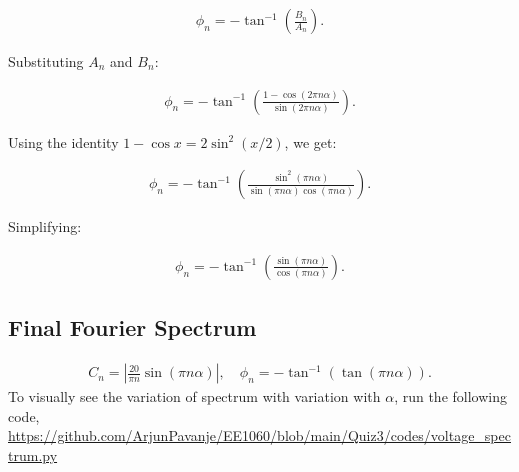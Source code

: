 \documentclass[12pt,a4paper]{report}
\begin{document}
\begin{align}
\phi_n = -\tan^{-1} \left( \frac{B_n}{A_n} \right).
\end{align}

Substituting $ A_n $ and $ B_n $:

\begin{align}
\phi_n = -\tan^{-1} \left( \frac{1 - \cos(2\pi n \alpha)}{\sin(2\pi n \alpha)} \right).
\end{align}

Using the identity $ 1 - \cos x = 2 \sin^2(x/2) $, we get:

\begin{align}
\phi_n = -\tan^{-1} \left( \frac{\sin^2 (\pi n \alpha)}{\sin (\pi n \alpha) \cos (\pi n \alpha)} \right).
\end{align}

Simplifying:

\begin{align}
\phi_n = -\tan^{-1} \left( \frac{\sin (\pi n \alpha)}{\cos (\pi n \alpha)} \right).
\end{align}

\subsection{Final Fourier Spectrum}

\begin{align}
C_n = \left|\frac{20}{\pi n} \sin(\pi n \alpha)\right|, \quad \phi_n = -\tan^{-1} \left(\tan (\pi n \alpha)\right).
\end{align}
To visually see the variation of spectrum with variation with $\alpha$, run the following code, \url{https://github.com/ArjunPavanje/EE1060/blob/main/Quiz3/codes/voltage_spectrum.py}
\end{document}
